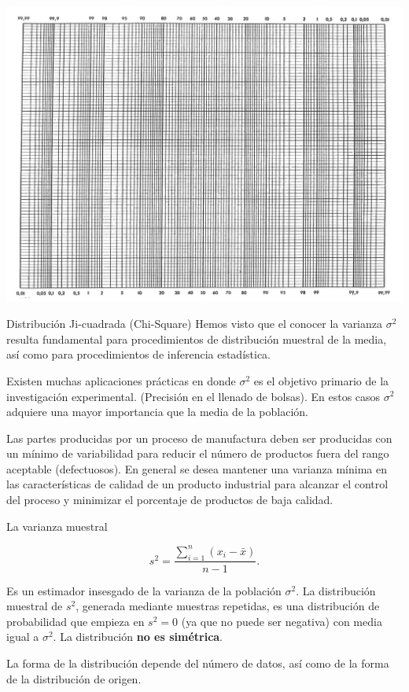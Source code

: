 \documentclass[
  10pt,
  ignorenonframetext,
]{beamer}
\begin{document}
\begin{frame}{}
\protect\hypertarget{section-45}{}
\includegraphics{figuras/probpaperLandscape.png}
\end{frame}

\begin{frame}{Distribución Ji-cuadrada (Chi-Square)}
\protect\hypertarget{distribuciuxf3n-ji-cuadrada-chi-square}{}
Hemos visto que el conocer la varianza \(\sigma^2\) resulta fundamental
para procedimientos de distribución muestral de la media, así como para
procedimientos de inferencia estadística.

Existen muchas aplicaciones prácticas en donde \(\sigma^2\) es el
objetivo primario de la investigación experimental. (Precisión en el
llenado de bolsas). En estos casos \(\sigma^2\) adquiere una mayor
importancia que la media de la población.

Las partes producidas por un proceso de manufactura deben ser producidas
con un mínimo de variabilidad para reducir el número de productos fuera
del rango aceptable (defectuosos). En general se desea mantener una
varianza mínima en las características de calidad de un producto
industrial para alcanzar el control del proceso y minimizar el
porcentaje de productos de baja calidad.
\end{frame}

\begin{frame}{}
\protect\hypertarget{section-46}{}
La varianza muestral

\[s^2=\frac{\sum_{i=1}^n (x_i -\bar{x})}{n-1}.\]

Es un estimador insesgado de la varianza de la población \(\sigma^2\).
La distribución muestral de \(s^2\), generada mediante muestras
repetidas, es una distribución de probabilidad que empieza en
\(s^2 = 0\) (ya que no puede ser negativa) con media igual a
\(\sigma^2\). La distribución \textbf{no es simétrica}.

La forma de la distribución depende del número de datos, así como de la
forma de la distribución de origen.
\end{frame}
\end{document}
